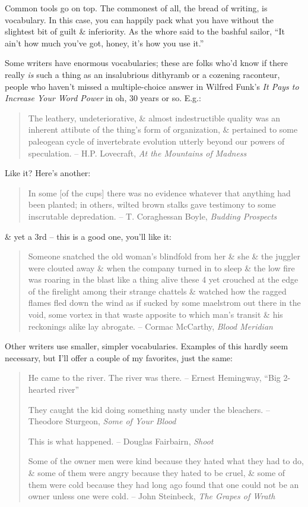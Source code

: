 \documentclass{article}
\numberwithin{equation}{section}
\begin{document}
Common tools go on top. The commonest of all, the bread of writing, is vocabulary. In this case, you can happily pack what you have without the slightest bit of guilt \& inferiority. As the whore said to the bashful sailor, ``It ain't how much you've got, honey, it's how you use it.''

Some writers have enormous vocabularies; these are folks who'd know if there really \textit{is} such a thing as an insalubrious dithyramb or a cozening raconteur, people who haven't missed a multiple-choice answer in Wilfred Funk's \textit{It Pays to Increase Your Word Power} in oh, 30 years or so. E.g.:
\begin{quotation}
	The leathery, undeteriorative, \& almost indestructible quality was an inherent attibute of the thing's form of organization, \& pertained to some paleogean cycle of invertebrate evolution utterly beyond our powers of speculation. -- H.P. Lovecraft, \textit{At the Mountains of Madness}
\end{quotation}
Like it? Here's another:
\begin{quotation}
	In some [of the cups] there was no evidence whatever that anything had been planted; in others, wilted brown stalks gave testimony to some inscrutable depredation. -- T. Coraghessan Boyle, \textit{Budding Prospects}
\end{quotation}
\& yet a 3rd -- this is a good one, you'll like it:
\begin{quotation}
	Someone snatched the old woman's blindfold from her \& she \& the juggler were clouted away \& when the company turned in to sleep \& the low fire was roaring in the blast like a thing alive these 4 yet crouched at the edge of the firelight among their strange chattels \& watched how the ragged flames fled down the wind as if sucked by some maelstrom out there in the void, some vortex in that waste apposite to which man's transit \& his reckonings alike lay abrogate. -- Cormac McCarthy, \textit{Blood Meridian}
\end{quotation}
Other writers use smaller, simpler vocabularies. Examples of this hardly seem necessary, but I'll offer a couple of my favorites, just the same:
\begin{quotation}
	He came to the river. The river was there. -- Ernest Hemingway, ``Big 2-hearted river''
	
	They caught the kid doing something nasty under the bleachers. -- Theodore Sturgeon, \textit{Some of Your Blood}
	
	This is what happened. -- Douglas Fairbairn, \textit{Shoot}
	
	Some of the owner men were kind because they hated what they had to do, \& some of them were angry because they hated to be cruel, \& some of them were cold because they had long ago found that one could not be an owner unless one were cold. -- John Steinbeck, \textit{The Grapes of Wrath}
\end{quotation}
\end{document}
